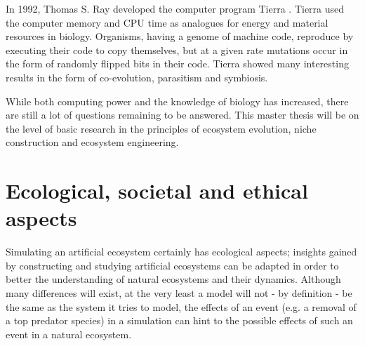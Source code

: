 In 1992, Thomas S. Ray developed the computer program Tierra \citep{ray1992evolution}. Tierra used the computer memory and CPU time as analogues for energy and material resources in biology. Organisms, having a genome of machine code, reproduce by executing their code to copy themselves, but at a given rate mutations occur in the form of randomly flipped bits in their code. Tierra showed many interesting results in the form of co-evolution, parasitism and symbiosis.



While both computing power and the knowledge of biology has increased, there are still a lot of questions remaining to be answered. This master thesis will be on the level of basic research in the principles of ecosystem evolution, niche construction and ecosystem engineering.


\section{Ecological, societal and ethical aspects}
Simulating an artificial ecosystem certainly has ecological aspects; insights gained by constructing and studying artificial ecosystems can be adapted in order to better the understanding of natural ecosystems and their dynamics. Although many differences will exist, at the very least a model will not  - by definition - be the same as the system it tries to model, the effects of an event (e.g. a removal of a top predator species) in a simulation can hint to the possible effects of such an event in a natural ecosystem. 

